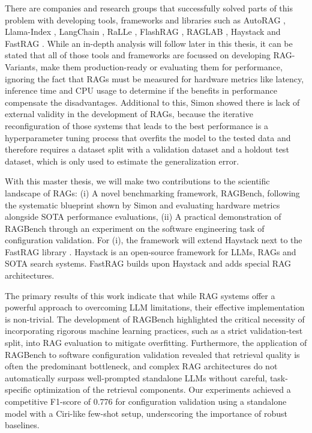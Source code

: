There are companies and research groups that successfully solved parts of this problem with developing tools, frameworks and libraries such as AutoRAG \cite{AutoRAG}, Llama-Index \cite{Liu_LlamaIndex_2022}, LangChain \cite{Chase_LangChain_2022}, RaLLe \cite{ralle}, FlashRAG \cite{FlashRAG}, RAGLAB \cite{zhang-etal-2024-raglab}, Haystack \cite{Pietsch_Haystack_the_end-to-end_2019} and FastRAG \cite{Izsak_fastRAG_Efficient_Retrieval_2023}. While an in-depth analysis will follow later in this thesis, it can be stated that all of those tools and frameworks are focussed on developing RAG-Variants, make them production-ready or evaluating them for performance, ignoring the fact that RAGs must be measured for hardware metrics like latency, inference time and CPU usage to determine if the benefits in performance compensate the disadvantages. Additional to this, Simon \cite{Simon.10112024} showed there is lack of external validity in the development of RAGs, because the iterative reconfiguration of those systems that leads to the best performance is a hyperparameter tuning process that overfits the model to the tested data and therefore requires a dataset split with a validation dataset and a holdout test dataset, which is only used to estimate the generalization error.

With this master thesis, we will make two contributions to the scientific landscape of RAGs: (i) A novel benchmarking framework, RAGBench, following the systematic blueprint shown by Simon \cite{Simon.10112024} and evaluating hardware metrics alongside SOTA performance evaluations, (ii) A practical demonstration of RAGBench through an experiment on the software engineering task of configuration validation. For (i), the framework will extend Haystack \cite{Pietsch_Haystack_the_end-to-end_2019} next to the FastRAG library \cite{Izsak_fastRAG_Efficient_Retrieval_2023}. Haystack is an open-source framework for LLMs, RAGs and SOTA search systems. FastRAG builds upon Haystack and adds special RAG architectures. 

The primary results of this work indicate that while RAG systems offer a powerful approach to overcoming LLM limitations, their effective implementation is non-trivial. The development of RAGBench highlighted the critical necessity of incorporating rigorous machine learning practices, such as a strict validation-test split, into RAG evaluation to mitigate overfitting. Furthermore, the application of RAGBench to software configuration validation revealed that retrieval quality is often the predominant bottleneck, and complex RAG architectures do not automatically surpass well-prompted standalone LLMs without careful, task-specific optimization of the retrieval components. Our experiments achieved a competitive F1-score of 0.776 for configuration validation using a standalone model with a Ciri-like few-shot setup, underscoring the importance of robust baselines.

